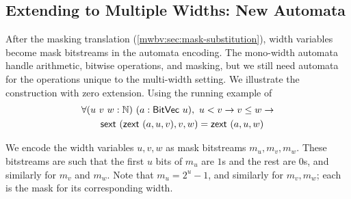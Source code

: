 \subsection{Extending to Multiple Widths: New Automata}

After the masking translation (\cref{mwbv:sec:mask-substitution}), width variables
become mask bitstreams in the automata encoding.
The mono-width automata handle arithmetic, bitwise operations, and masking,
but we still need automata for the operations unique to the multi-width setting.
We illustrate the construction with zero extension.
Using the running example of
\[
\begin{aligned}
  &\forall (u~v~w : \mathbb N)~(a : \mathsf{BitVec}~{u}),~ u < v \to v \leq w \to\\
  &\qquad \mathsf{sext}~(\mathsf{zext}~(a, u, v), v, w) = \mathsf{zext}~(a, u, w)
\end{aligned}
\]

We encode the width variables $u, v, w$ as mask bitstreams $m_u, m_v, m_w$.
These bitstreams are such that the first $u$ bits of $m_u$ are $1$s and the rest are $0$s, and similarly for $m_v$ and $m_w$.
Note that $m_u = 2^u - 1$, and similarly for $m_v, m_w$; each is the mask for its corresponding width.

